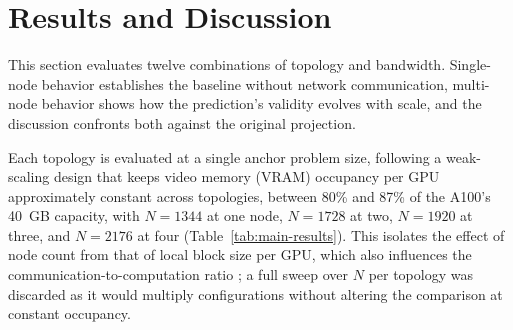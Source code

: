 \documentclass[12pt]{article}
\begin{document}
\section{Results and Discussion}

This section evaluates twelve combinations of topology and bandwidth. Single-node behavior establishes the baseline without network communication, multi-node behavior shows how the prediction's validity evolves with scale, and the discussion confronts both against the original projection.

\begin{table}[tb]
  \centering
  \small
  \caption{Throughput (MSamples/s) and effective overlap ratio ME (\%) per topology and bandwidth, mean $\pm$ 95\% confidence interval (CI) over 5 repetitions, at the anchor size $N$. Each node contributes four A100 GPUs; the partitioning column gives the process grid used.}
  \label{tab:main-results}
\end{table}

Each topology is evaluated at a single anchor problem size, following a weak-scaling design that keeps video memory (VRAM) occupancy per GPU approximately constant across topologies, between 80\% and 87\% of the A100's 40~GB capacity, with $N=1344$ at one node, $N=1728$ at two, $N=1920$ at three, and $N=2176$ at four (Table~\ref{tab:main-results}). This isolates the effect of node count from that of local block size per GPU, which also influences the communication-to-computation ratio \cite{spadotto2026tcc}; a full sweep over $N$ per topology was discarded as it would multiply configurations without altering the comparison at constant occupancy.
\end{document}

